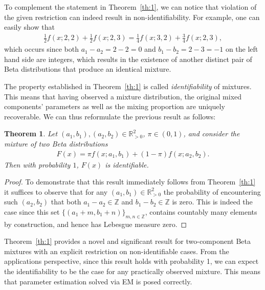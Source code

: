 \documentclass[lettersize,journal]{IEEEtran}
\newtheorem{theorem}{Theorem}
\newtheorem{proof}{Proof}
\begin{document}
To complement the statement in Theorem~\ref{th:1}, we can notice that violation of the given restriction can indeed result in non-identifiability. For example, one can easily show that
\begin{align*}
    \frac{1}{2}f(x;2,2) + \frac{1}{2} f(x;2,3) = \frac{1}{4} f(x;3,2) + \frac{3}{4}f(x;2,3),
\end{align*}
which occurs since both $a_1-a_2=2-2=0$ and $b_1-b_2=2-3=-1$ on the left hand side are integers, which results in the existence of another distinct pair of Beta distributions that produce an identical mixture.

The property established in Theorem~\ref{th:1} is called {\it identifiability} of mixtures. This means that having observed a mixture distribution, the original mixed components' parameters as well as the mixing proportion are uniquely recoverable. We can thus reformulate the previous result as follows:

\begin{theorem}\label{th:2}
 Let $(a_1,b_1),(a_2,b_2) \in \mathbb{R}^2_{>0}$, $\pi \in (0,1)$, and consider the mixture of two Beta distributions
    \begin{align*}
        F(x) = \pi f(x;a_1,b_1)+(1-\pi)f(x;a_2,b_2).
    \end{align*}
Then with probability $1$, $F(x)$ is identifiable.
\end{theorem}

\begin{proof}
To demonstrate that this result immediately follows from Theorem~\ref{th:1} it suffices to observe that for any $(a_1,b_1)\in\mathbb{R}^2_{>0}$ the probability of encountering such $(a_2,b_2)$ that both $a_1-a_2\in\mathbb{Z}$ and $b_1-b_2\in\mathbb{Z}$ is zero. This is indeed the case since this set $\{(a_1+m,b_1+n)\}_{m,n\in \mathbb{Z}}$, contains countably many elements by construction, and hence has Lebesgue measure zero.
\end{proof}

Theorem~\ref{th:1} provides a novel and significant result for two-component Beta mixtures with an explicit restriction on non-identifiable cases. From the applications perspective, since this result holds with probability 1, we can expect the identifiability to be the case for any practically observed mixture. This means that parameter estimation solved via EM is posed correctly.

\end{document}
